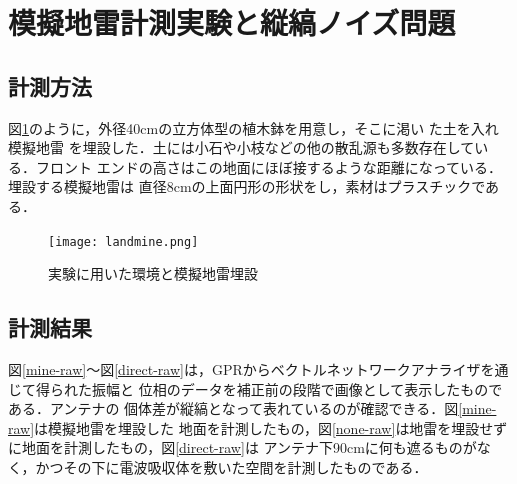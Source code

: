﻿\documentclass[12pt,oneside]{jsbook}
\begin{document}
\newpage
\section{模擬地雷計測実験と縦縞ノイズ問題}

\subsection{計測方法}
図\ref{landmine}のように，外径40cmの立方体型の植木鉢を用意し，そこに渇い
た土を入れ模擬地雷
を埋設した．土には小石や小枝などの他の散乱源も多数存在している．フロント
エンドの高さはこの地面にほぼ接するような距離になっている．埋設する模擬地雷は
直径8cmの上面円形の形状をし，素材はプラスチックである．
\begin{figure}[hbtp]
 \begin{center}
 \texttt{[image: landmine.png]}
\caption{実験に用いた環境と模擬地雷埋設}
\label{landmine}
 \end{center}
\end{figure}
\subsection{計測結果}
図\ref{mine-raw}〜図\ref{direct-raw}は，GPRからベクトルネットワークアナライザを通じて得られた振幅と
位相のデータを補正前の段階で画像として表示したものである．アンテナの
個体差が縦縞となって表れているのが確認できる．図\ref{mine-raw}は模擬地雷を埋設した
地面を計測したもの，図\ref{none-raw}は地雷を埋設せずに地面を計測したもの，図\ref{direct-raw}は
アンテナ下90cmに何も遮るものがなく，かつその下に電波吸収体を敷いた空間を計測したものである．
\end{document}
